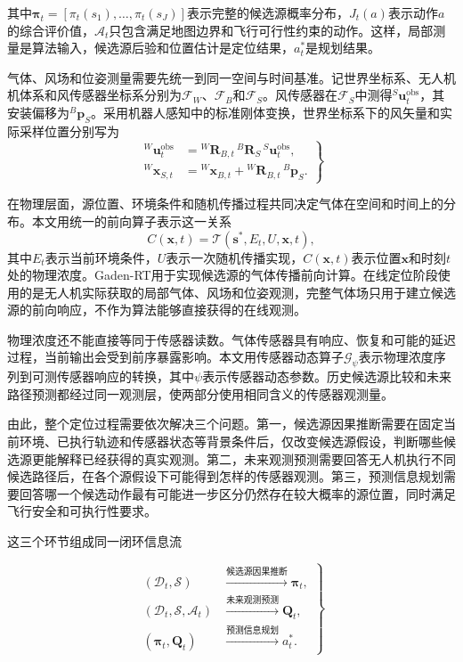 \documentclass{aas}
\newcommand{\ccite}[1]{\nobreak\cite{#1}}
\begin{document}
{
  其中$\boldsymbol\pi_t=[\pi_t(s_1),\ldots,\pi_t(s_J)]$表示完整的候选源概率分布，$J_t(a)$表示动作$a$的综合评价值，$\mathcal A_t$只包含满足地图边界和飞行可行性约束的动作。这样，局部测量是算法输入，候选源后验和位置估计是定位结果，$a_t^*$是规划结果。
}

{
气体、风场和位姿测量需要先统一到同一空间与时间基准。记世界坐标系、无人机机体系和风传感器坐标系分别为$\mathcal F_W$、$\mathcal F_B$和$\mathcal F_S$。风传感器在$\mathcal F_S$中测得$^{S}\mathbf u_t^{\mathrm{obs}}$，其安装偏移为$^{B}\mathbf p_S$。采用机器人感知中的标准刚体变换\ccite{33}，世界坐标系下的风矢量和实际采样位置分别写为
}
\begin{equation}
\left.
\begin{aligned}
{}^{W}\mathbf u_t^{\mathrm{obs}}&={}^{W}\mathbf R_{B,t}\,{}^{B}\mathbf R_{S}\,{}^{S}\mathbf u_t^{\mathrm{obs}},\\
{}^{W}\mathbf x_{S,t}&={}^{W}\mathbf x_{B,t}+{}^{W}\mathbf R_{B,t}\,{}^{B}\mathbf p_S.
\end{aligned}
\right\}
\label{eq:coordinate_transforms}
\end{equation}

{
在物理层面，源位置、环境条件和随机传播过程共同决定气体在空间和时间上的分布。本文用统一的前向算子表示这一关系
}
\begin{equation}
C(\mathbf x,t)=\mathcal T(\mathbf s^*,E_t,U,\mathbf x,t),
\label{eq:transport_operator_definition}
\end{equation}
{
其中$E_t$表示当前环境条件，$U$表示一次随机传播实现，$C(\mathbf x,t)$表示位置$\mathbf x$和时刻$t$处的物理浓度。Gaden-RT用于实现候选源的气体传播前向计算\ccite{7}。在线定位阶段使用的是无人机实际获取的局部气体、风场和位姿观测，完整气体场只用于建立候选源的前向响应，不作为算法能够直接获得的在线观测。
}

{
物理浓度还不能直接等同于传感器读数。气体传感器具有响应、恢复和可能的延迟过程，当前输出会受到前序暴露影响\ccite{5,15}。本文用传感器动态算子$\mathcal G_{\psi}$表示物理浓度序列到可测传感器响应的转换，其中$\psi$表示传感器动态参数。历史候选源比较和未来路径预测都经过同一观测层，使两部分使用相同含义的传感器观测量。
}

{
由此，整个定位过程需要依次解决三个问题。第一，候选源因果推断需要在固定当前环境、已执行轨迹和传感器状态等背景条件后，仅改变候选源假设，判断哪些候选源更能解释已经获得的真实观测。第二，未来观测预测需要回答无人机执行不同候选路径后，在各个源假设下可能得到怎样的传感器观测。第三，预测信息规划需要回答哪一个候选动作最有可能进一步区分仍然存在较大概率的源位置，同时满足飞行安全和可执行性要求。

这三个环节组成同一闭环信息流
}
\begin{equation}
\left.
\begin{aligned}
(\mathcal D_t,\mathcal S)
&\xrightarrow{\text{候选源因果推断}}
\boldsymbol\pi_t,\\
(\mathcal D_t,\mathcal S,\mathcal A_t)
&\xrightarrow{\text{未来观测预测}}
\mathbf Q_t,\\
(\boldsymbol\pi_t,\mathbf Q_t)
&\xrightarrow{\text{预测信息规划}}
a_t^*.
\end{aligned}
\right\}
\label{eq:belief_prediction_action}
\end{equation}
\end{document}

